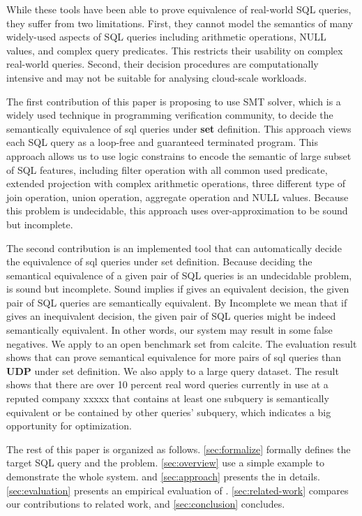 While these tools have been able to prove equivalence of real-world SQL queries,
they suffer from two limitations.
First, they cannot model the semantics of many widely-used aspects of SQL
queries including arithmetic operations, NULL values, and complex query
predicates. This restricts their usability on complex real-world queries.
Second, their decision procedures are computationally intensive and
may not be suitable for analysing cloud-scale workloads.

The first contribution of this paper is proposing to use SMT solver, which is a
widely used technique in programming verification community, to decide the
semantically equivalence of sql queries under \textbf{set} definition.
This approach views each SQL query as a loop-free and guaranteed terminated
program.
This approach allows us to use logic constrains to encode the semantic of large
subset of SQL features, including filter operation with all common used
predicate, extended projection with complex arithmetic operations, three
different type of join operation, union operation, aggregate operation and NULL
values.
Because this problem is undecidable, this approach uses over-approximation to be
sound but incomplete.

The second contribution is an implemented tool \sys that can automatically
decide the equivalence of sql queries under set definition.
Because deciding the semantical equivalence of a given pair of SQL queries is an
undecidable problem, \sys is sound but incomplete.
Sound implies if \sys gives an equivalent decision, the given pair of SQL
queries are semantically equivalent.
By Incomplete we mean that if \sys gives an inequivalent decision, the given
pair of SQL queries might be indeed semantically equivalent. In other words, our
system \sys may result in some false negatives.
We apply \sys to an open benchmark set from calcite.
The evaluation result shows that \sys can prove semantical equivalence for more
pairs of sql queries than \textbf{UDP} under set definition.
We also apply \sys to a large query dataset.
The result shows that there are over 10 percent real word queries currently in
use at a reputed company xxxxx that contains at least one subquery is
semantically equivalent or be contained by other queries' subquery, which
indicates a big opportunity for optimization.

The rest of this paper is organized as follows.
\autoref{sec:formalize} formally defines the target SQL query and the problem.
\autoref{sec:overview} use a simple example to demonstrate the whole system.
and \autoref{sec:approach} presents the \sys in details.
\autoref{sec:evaluation} presents an empirical evaluation of \sys.
\autoref{sec:related-work} compares our contributions to related work, and
\autoref{sec:conclusion} concludes.
